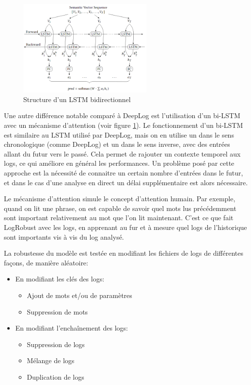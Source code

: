 \documentclass[openany, 11pt]{memoir}
\begin{document}
\begin{figure}[ht]
	\centering
	\includegraphics[width=0.6\textwidth]{images/bilstm.png}
	\caption{Structure d'un LSTM bidirectionnel}
	\label{bilstm}
\end{figure}

\bigskip
Une autre différence notable comparé à DeepLog est l'utilisation d'un bi-\gls{LSTM} avec un mécanisme d'attention (voir figure \ref{bilstm}). Le fonctionnement d'un bi-\gls{LSTM} est similaire au \gls{LSTM} utilisé par DeepLog, mais on en utilise un dans le sens chronologique (comme DeepLog) et un dans le sens inverse, avec des entrées allant du futur vers le passé. Cela permet de rajouter un contexte temporel aux \glspl{log}, ce qui améliore en général les performances. Un problème posé par cette approche est la nécessité de connaitre un certain nombre d'entrées dans le futur, et dans le cas d'une analyse en direct un délai supplémentaire est alors nécessaire.

Le mécanisme d'attention simule le concept d'attention humain. Par exemple, quand on lit une phrase, on est capable de savoir quel mots lus précédemment sont important relativement au mot que l'on lit maintenant. C'est ce que fait LogRobust avec les \glspl{log}, en apprenant au fur et à mesure quel \glspl{log} de l'historique sont importants vis à vis du log analysé.

\bigskip
La robustesse du modèle est testée en modifiant les fichiers de logs de différentes façons, de manière aléatoire:

\begin{itemize}
	\item En modifiant les clés des \glspl{log}:
	\begin{itemize}
		\item Ajout de mots et/ou de paramètres
		\item Suppression de mots
	\end{itemize}
	\item En modifiant l'enchaînement des \glspl{log}:
	\begin{itemize}
		\item Suppression de \glspl{log}
		\item Mélange de \glspl{log}
		\item Duplication de \glspl{log}
	\end{itemize}
\end{itemize}
\end{document}
